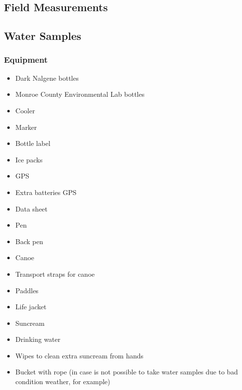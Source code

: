 \begin{appendices}
\chapter{Field Measurements}
\label{ch:fieldmea}
\section{Water Samples}


\subsection{Equipment}

\begin{multicols}{3}
\begin{itemize}
  \item Dark Nalgene bottles
  \item Monroe County Environmental Lab bottles
  \item Cooler
  \item Marker
  \item Bottle label
  \item Ice packs
  \item GPS
  \item Extra batteries GPS
  \item Data sheet
  \item Pen
  \item Back pen
  \item Canoe 
  \item Transport straps for canoe
  \item Paddles
  \item Life jacket
  \item Suncream 
  \item Drinking water
  \item Wipes to clean extra suncream from hands
  \item Bucket with rope (in case is not possible to take water samples due to bad condition weather, for example)
\end{itemize}
\end{multicols}



\end{appendices}

